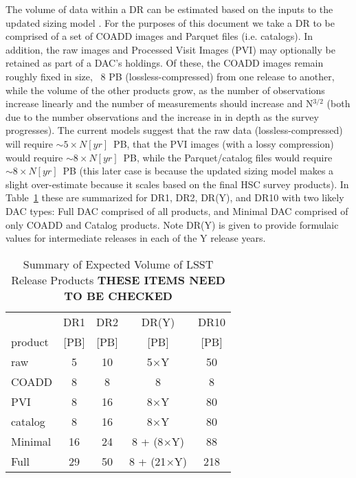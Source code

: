 The volume of data within a DR can be estimated based on the inputs to the updated sizing model .  
For the purposes of this document we take a DR to be comprised of a set of COADD images and Parquet files (i.e. catalogs).  
In addition, the raw images and Processed Visit Images (PVI) may optionally be retained as part of a DAC's holdings.  
Of these, the COADD images remain roughly fixed in size, ~8 PB (lossless-compressed) from one release to another,
while the volume of the other products grow, as the number of observations increase linearly and the number of measurements 
should increase and N$^{3/2}$ (both due to the number observations and the increase in in depth as the survey progresses).  
The current models suggest that the raw data (lossless-compressed) will require $\sim 5\times N[yr]$~PB, that the PVI 
images (with a lossy compression) would require $\sim 8\times N[yr]$~PB, while the Parquet/catalog files would 
require $\sim 8\times N[yr]$~PB (this later case is because the updated sizing model makes a slight over-estimate 
because it scales based on the final HSC survey products).  In Table~\ref{tab_volume} these are summarized for DR1, DR2, 
DR(Y), and DR10 with two likely DAC types: Full DAC comprised of all products, and Minimal DAC comprised of only COADD 
and Catalog products.  Note DR(Y) is given to provide formulaic values for intermediate releases in each of the Y release years.

\begin{table}[!ht]
\caption{Summary of Expected Volume of LSST Release Products {\bf THESE ITEMS NEED TO BE CHECKED }}
\label{tab_volume}
\footnotesize
\centering
\begin{tabular}[]{|l|cccc|}
\hline
\hline
            &   DR1  &  DR2   &  DR(Y)  &  DR10 \\
 product    &  [PB]  &  [PB]  &  [PB]   &  [PB] \\
\hline
 raw        &    5   &   10   &  5$\times$Y    &   50   \\
 COADD      &    8   &    8   &    8           &    8   \\
 PVI        &    8   &   16   &  8$\times$Y    &   80   \\
 catalog    &    8   &   16   &  8$\times$Y    &   80   \\
\hline
 Minimal    &   16   &   24   &  8 + (8$\times$Y) &   88   \\
 Full       &   29   &   50   &  8 + (21$\times$Y) &  218  \\
\hline
\end{tabular}
\end{table}

